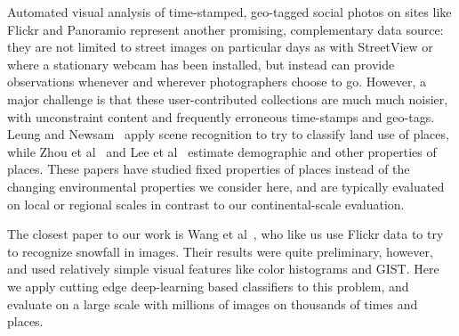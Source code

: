 Automated visual analysis of time-stamped, geo-tagged social photos on
sites like Flickr and Panoramio represent another promising,
complementary data source: they are not limited to street images on
particular days as with StreetView or where a stationary webcam has
been installed, but instead can provide observations whenever and
wherever photographers choose to go. However, a major challenge is that these
user-contributed collections are much much noisier, with unconstraint
content and frequently erroneous time-stamps and geo-tags.  Leung and
Newsam~\cite{Leung:2010wa} apply scene recognition to try to classify
land use of places, while Zhou et al~\cite{zhou2014} and Lee et
al~\cite{geoinformatics2015wacv} estimate demographic and other
properties of places. These papers have studied fixed properties
of places instead of the changing environmental properties we consider here,
and are typically evaluated on local or regional scales in contrast to
our continental-scale evaluation.

The closest paper to our work is Wang et al~\cite{wang2013observing},
who like us use Flickr data to try to recognize snowfall in images.
Their results were quite preliminary, however, and used relatively
simple visual features like color histograms and GIST. Here we apply
cutting edge deep-learning based classifiers to this problem, and evaluate
on a large scale with millions of images on thousands of times and places.





